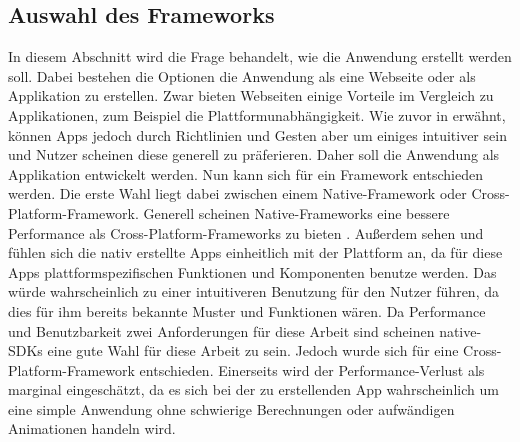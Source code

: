 \subsection{Auswahl des Frameworks}\label{subsection:auswahlDesFrameworks}%
In diesem Abschnitt wird die Frage behandelt, wie die Anwendung erstellt werden soll. %
Dabei bestehen die Optionen die Anwendung als eine Webseite oder als Applikation zu erstellen. %
	Zwar bieten Webseiten einige Vorteile im Vergleich zu Applikationen, zum Beispiel die Plattformunabhängigkeit. Wie zuvor in  erwähnt, können Apps jedoch durch Richtlinien und Gesten aber um einiges intuitiver sein und Nutzer scheinen diese generell zu präferieren\cite{pcVsphone_mobileAppVsWebTimeSpent}. %
	Daher soll die Anwendung als Applikation entwickelt werden. %
%
\newline
\myNewSection
Nun kann sich für ein Framework entschieden werden. %
Die erste Wahl liegt dabei zwischen einem Native-Framework oder Cross-Platform-Framework.\newline%
	Generell scheinen Native-Frameworks eine bessere Performance als Cross-Platform-Frameworks zu bieten \cite{tech_performanceReactNativeVsFlutter1, tech_performanceReactNativeVsFlutter2}. %
	Außerdem sehen und fühlen sich die nativ erstellte Apps einheitlich mit der Plattform an, da für diese Apps plattformspezifischen Funktionen und Komponenten benutze werden.
		Das würde wahrscheinlich zu einer intuitiveren Benutzung für den Nutzer führen, da dies für ihm bereits bekannte Muster und Funktionen wären. %
		Da Performance und Benutzbarkeit zwei Anforderungen für diese Arbeit sind scheinen native-SDKs eine gute Wahl für diese Arbeit zu sein.\newline%
	Jedoch wurde sich für eine Cross-Platform-Framework entschieden. %
		Einerseits wird der Performance-Verlust als marginal eingeschätzt, da es sich bei der zu erstellenden App wahrscheinlich um eine simple Anwendung ohne schwierige Berechnungen oder aufwändigen Animationen handeln wird. 
